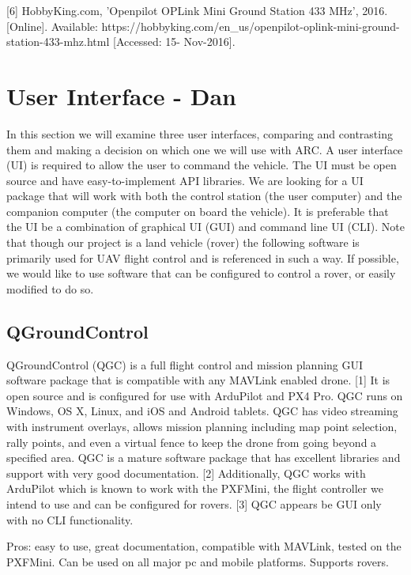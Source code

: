 \documentclass[compsoc,draftclsnofoot,onecolumn,10pt]{IEEEtran}
\begin{document}
[6] HobbyKing.com, 'Openpilot OPLink Mini Ground Station 433 MHz', 2016.  [Online]. Available: https://hobbyking.com/en\_us/openpilot-oplink-mini-ground-station-433-mhz.html [Accessed: 15- Nov-2016].\par

\newpage

\section{User Interface - Dan}
In this section we will examine three user interfaces, comparing and contrasting
them and making a decision on which one we will use with ARC.
A user interface (UI) is required to allow the user to command the vehicle. The
UI must be open source and have easy-to-implement API libraries. We are looking
for a UI package that will work with both the control station (the user
computer) and the companion computer (the computer on board the vehicle). It is
preferable that the UI be a combination of graphical UI (GUI) and command line
UI (CLI). Note that though our project is a land vehicle (rover) the following
software is primarily used for UAV flight control and is referenced in such a
way. If possible, we would like to use software that can be configured to
control a rover, or easily modified to do so.

\subsection{QGroundControl}

QGroundControl (QGC) is a full flight control and mission planning GUI software
package that is compatible with any MAVLink enabled drone. [1] It is open source and
is configured for use with ArduPilot and PX4 Pro. QGC runs on Windows, OS X,
Linux, and iOS and Android tablets. QGC has video streaming with instrument
overlays, allows mission planning including map point selection, rally points,
and even a virtual fence to keep the drone from going beyond a specified area.
QGC is a mature software package that has excellent libraries and support with
very good documentation. [2]
Additionally, QGC works with ArduPilot which is known to work with the PXFMini,
the flight controller we intend to use and can be configured for rovers. [3] QGC 
appears be GUI only with no CLI functionality.

Pros: easy to use, great documentation, compatible with MAVLink, tested on the
PXFMini. Can be used on all major pc and mobile platforms. Supports rovers.
\end{document}
